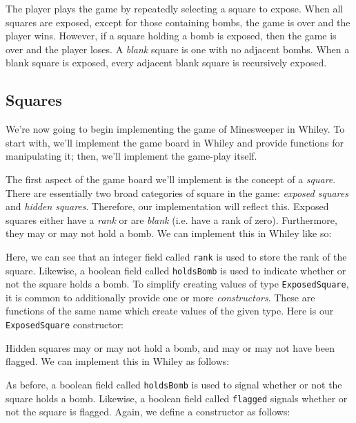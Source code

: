 The player plays the game by repeatedly selecting a square to expose.  When all squares are exposed, except for those containing bombs, the game is over and the player wins.  However, if a square holding a bomb is exposed, then the game is over and the player loses.  A {\em blank} square is one with no adjacent bombs.  When a blank square is exposed, every adjacent blank square is recursively exposed.

\subsection{Squares}
We're now going to begin implementing the game of Minesweeper in Whiley.  To start with, we'll implement the game board in Whiley and provide functions for manipulating it; then, we'll implement the game-play itself.  

The first aspect of the game board we'll implement is the concept of a {\em square}.  There are essentially two broad categories of square in the game: {\em exposed squares} and {\em hidden squares}.  Therefore, our implementation will reflect this.  Exposed squares either have a {\em rank} or are {\em blank} (i.e. have a rank of zero).  Furthermore, they may or may not hold a bomb.  We can implement this in Whiley like so:



Here, we can see that an integer field called \lstinline{rank} is used to store the rank of the square.  Likewise, a boolean field called \lstinline{holdsBomb} is used to indicate whether or not the square holds a bomb.  To simplify creating values of type \lstinline{ExposedSquare}, it is common to additionally provide one or more {\em constructors}.  These are functions of the same name which create values of the given type.  Here is our \lstinline{ExposedSquare} constructor:



Hidden squares may or may not hold a bomb, and may or may not have been flagged.  We can implement this in Whiley as follows:



As before, a boolean field called \lstinline{holdsBomb} is used to signal whether or not the square holds a bomb.  Likewise, a boolean field called \lstinline{flagged} signals whether or not the square is flagged.  Again, we define a constructor as follows:

